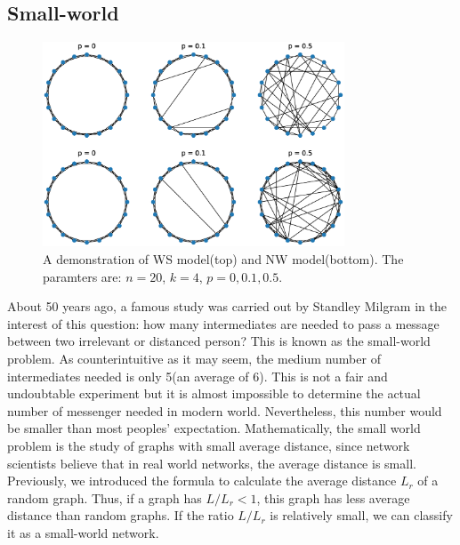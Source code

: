 \documentclass[12pt]{article}
\begin{document}
{\subsection{Small-world}
\label{small_world}

\begin{figure}[h]
    \includegraphics[width = 0.8\textwidth]{small_world_network_model.eps}
    \centering
    \caption{A demonstration of WS model(top) and NW model(bottom). The paramters are: $n=20$, $k=4$, $p=0,0.1,0.5$.}
    \label{fig:small_world_models}
\end{figure}
About 50 years ago, a famous study was carried out by Standley Milgram\cite{milgram1967small} in the interest of this question: how many intermediates are needed to pass a message between two irrelevant or distanced person? This is known as the small-world problem. As counterintuitive as it may seem, the medium number of intermediates needed is only 5(an average of 6). This is not a fair and undoubtable experiment but it is almost impossible to determine the actual number of messenger needed in modern world. Nevertheless, this number would be smaller than most peoples' expectation. Mathematically, the small world problem is the study of graphs with small average distance, since network scientists believe that in real world networks, the average distance is small. Previously, we introduced the formula to calculate the average distance $L_r$ of a random graph. Thus, if a graph has $L/L_r <1$, this graph has less average distance than random graphs. If the ratio $L/L_r$ is relatively small, we can classify it as a small-world network.\\
\noindent
}
\end{document}

